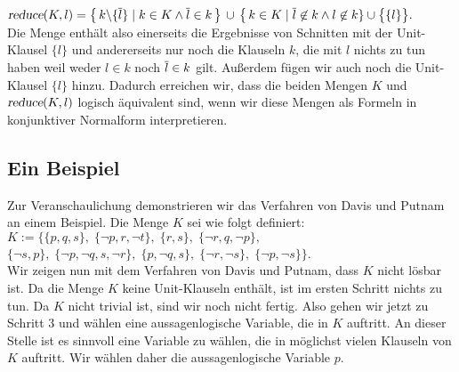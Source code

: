 $\textsl{reduce}(K,l)  = 
 \bigl\{\, k \backslash \{\overline{l}\} \;|\; k \in K \wedge \overline{l} \in k \,\bigr\} 
       \,\cup\, \bigl\{\, k \in K \mid \overline{l} \not\in k \wedge l \not\in k \} \cup \bigl\{\{l\}\bigr\}.
$
\\[0.2cm]
Die Menge enth\"{a}lt also einerseits die Ergebnisse von Schnitten mit
der Unit-Klausel $\{l\}$ und andererseits nur noch die Klauseln $k$,
die mit $l$ nichts zu tun haben weil weder $l \in k$ noch $\overline{l} \in k$
gilt.  Au\ss{}erdem f\"{u}gen wir auch noch die Unit-Klausel $\{l\}$ hinzu.
Dadurch erreichen wir, dass die beiden Mengen $K$ und $\textsl{reduce}(K,l)$
logisch \"{a}quivalent sind, wenn wir diese Mengen als Formeln in konjunktiver Normalform
interpretieren.  



\subsection{Ein Beispiel}
Zur Veranschaulichung demonstrieren wir das Verfahren von Davis und Putnam an einem Beispiel.
Die Menge $K$ sei wie folgt definiert: \\[0.2cm]
\hspace*{1.3cm} $K := \Big\{ \{p, q, s\},\; \{\neg p, r, \neg t\},\;  \{r, s\},\; \{\neg r, q, \neg p\},$ \\
\hspace*{2.5cm} $\{\neg s, p\},\; \{\neg p, \neg q, s, \neg r\},\; \{p, \neg q, s\},\; \{\neg r, \neg s\},\; \{\neg p, \neg s\} \Big\}  $. \\[0.2cm]
Wir zeigen nun mit dem Verfahren von Davis und Putnam, dass $K$ nicht l\"{o}sbar ist.  Da die
Menge $K$ keine Unit-Klauseln enth\"{a}lt, ist im ersten Schritt nichts zu tun.  Da $K$ nicht
trivial ist, sind wir noch nicht fertig.  Also gehen wir jetzt zu Schritt 3 und w\"{a}hlen
eine aussagenlogische Variable, die in $K$ auftritt.  An dieser Stelle ist es sinnvoll
eine Variable zu w\"{a}hlen, die in m\"{o}glichst vielen Klauseln von $K$ auftritt.  Wir w\"{a}hlen
daher die aussagenlogische Variable $p$.
